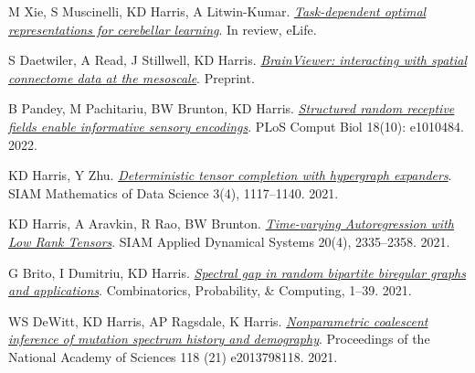 \documentclass[margin,line]{res}
\newenvironment{list1}{
  \begin{list}{$\cdot$}{%
      \setlength{\itemsep}{0in}
      \setlength{\parsep}{0in} \setlength{\parskip}{0in}
      \setlength{\topsep}{0in} \setlength{\partopsep}{0in} 
      \setlength{\leftmargin}{0.17in}}}{\end{list}}
\begin{document}
\begin{resume}
  {\setlength{\leftmargini}{0pt}
    \begin{etaremune}
    \item M Xie, S Muscinelli, KD Harris, A Litwin-Kumar.
      \textit{\href{https://www.biorxiv.org/content/10.1101/2022.08.15.504040}{Task-dependent optimal representations for cerebellar learning}}.
      In review, eLife.
    \item S Daetwiler, A Read, J Stillwell, KD Harris.
      \textit{\href{https://arxiv.org/abs/2205.02291}{BrainViewer: interacting with spatial connectome data at the mesoscale}}.
      Preprint.
    \item B Pandey, M Pachitariu, BW Brunton, KD Harris.
      \textit{\href{https://www.biorxiv.org/content/10.1101/2021.09.09.459651}{Structured random receptive fields enable informative sensory encodings}}.
       PLoS Comput Biol 18(10): e1010484. 2022.
    \item KD Harris, Y Zhu.
      \textit{\href{https://arxiv.org/abs/1910.10692}{Deterministic tensor completion with hypergraph expanders}}.
      SIAM Mathematics of Data Science 3(4), 1117--1140. 2021.
    \item KD Harris, A Aravkin, R Rao, BW Brunton.
      \textit{\href{https://arxiv.org/abs/1905.08389}{Time-varying Autoregression with Low Rank Tensors}}.
      SIAM Applied Dynamical Systems 20(4), 2335--2358. 2021.
    \item G Brito, I Dumitriu, KD Harris.
      \textit{\href{https://doi.org/10.1017/S0963548321000249}{
        Spectral gap in random bipartite biregular graphs 
        and applications}}.
    Combinatorics, Probability, \& Computing, 1--39. 2021.
    \item WS DeWitt, KD Harris, AP Ragsdale, K Harris.
      \textit{\href{https://www.biorxiv.org/content/10.1101/2020.06.16.153452v1}{Nonparametric coalescent inference of mutation spectrum history and demography}}.
      Proceedings of the National Academy of Sciences
      118 (21) e2013798118. 2021.

\end{etaremune}}
\end{resume}
\end{document}

